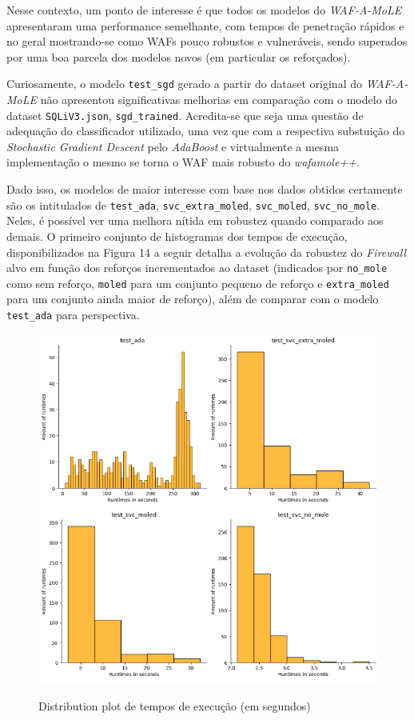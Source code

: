 Nesse contexto, um ponto  de interesse é que todos os modelos do \textit{WAF-A-MoLE} apresentaram uma performance semelhante, com tempos de penetração rápidos e no geral mostrando-se como WAFs pouco robustos e vulneráveis, sendo superados por uma boa parcela dos modelos novos (em particular os reforçados).

Curiosamente, o modelo \verb+test_sgd+ gerado a partir do dataset original do \textit{WAF-A-MoLE} não apresentou significativas melhorias em comparação com o modelo do dataset \verb+SQLiV3.json+, \verb+sgd_trained+. Acredita-se que seja uma questão de adequação do classificador utilizado, uma vez que com a respectiva substuição do \textit{Stochastic Gradient Descent} pelo \textit{AdaBoost} e virtualmente a mesma implementação o mesmo se torna o WAF mais robusto do \textit{wafamole++}.

Dado isso, os modelos de maior interesse com base nos dados obtidos certamente são os intitulados de \verb+test_ada+, \verb+svc_extra_moled+, \verb+svc_moled+, \verb+svc_no_mole+. Neles, é possível ver uma melhora nítida em robustez quando comparado aos demais. O primeiro conjunto de histogramas dos tempos de execução, disponibilizados na Figura 14 a seguir detalha a evolução da robustez do \textit{Firewall} alvo em função dos reforços incrementados ao dataset (indicados por \verb+no_mole+ como sem reforço, \verb+moled+ para um conjunto pequeno de reforço e \verb+extra_moled+ para um conjunto ainda maior de reforço), além de comparar com o modelo \verb+test_ada+ para perspectiva. 

\begin{figure}[ht]
    \centering
    \caption{Distribution plot de tempos de execução (em segundos)}
    \includegraphics[width=18cm]{figuras/graficos/runtimes_amount_set1.png} 
    \label{fig:mole-evolution} 
\end{figure}

